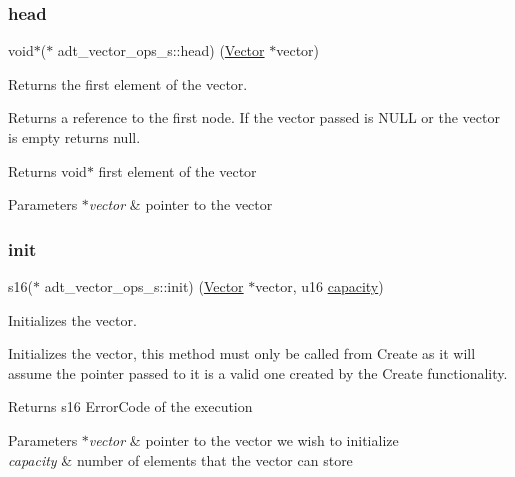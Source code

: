 \subsubsection{\texorpdfstring{head}{head}}
{\footnotesize\ttfamily void$\ast$($\ast$ adt\+\_\+vector\+\_\+ops\+\_\+s\+::head) (\hyperlink{structadt__vector__s}{Vector} $\ast$vector)}



Returns the first element of the vector. 

Returns a reference to the first node. If the vector passed is N\+U\+LL or the vector is empty returns null.

\begin{DoxyReturn}{Returns}
void$\ast$ first element of the vector 
\end{DoxyReturn}

\begin{DoxyParams}{Parameters}
{\em $\ast$vector} & pointer to the vector \\
\hline
\end{DoxyParams}
\mbox{\label{structadt__vector__ops__s_aad431f3e396c45fccae1da8e9e4aacfc}} 
\subsubsection{\texorpdfstring{init}{init}}
{\footnotesize\ttfamily s16($\ast$ adt\+\_\+vector\+\_\+ops\+\_\+s\+::init) (\hyperlink{structadt__vector__s}{Vector} $\ast$vector, u16 \hyperlink{structadt__vector__ops__s_aec1da152ce6f8d3b96ad1246378e6e64}{capacity})}



Initializes the vector. 

Initializes the vector, this method must only be called from Create as it will assume the pointer passed to it is a valid one created by the Create functionality.

\begin{DoxyReturn}{Returns}
s16 Error\+Code of the execution 
\end{DoxyReturn}

\begin{DoxyParams}{Parameters}
{\em $\ast$vector} & pointer to the vector we wish to initialize \\
\hline
{\em capacity} & number of elements that the vector can store \\
\hline
\end{DoxyParams}
\mbox{\label{structadt__vector__ops__s_a44c3ea859a1b1415a51504d4ed63e583}} 
